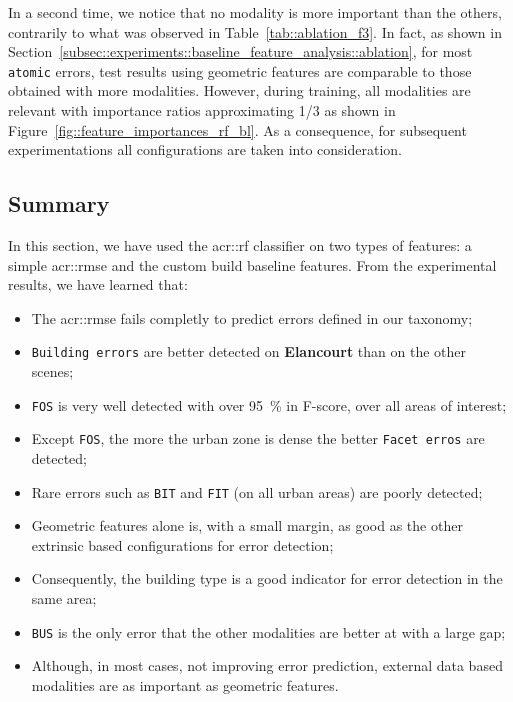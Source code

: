         In a second time, we notice that no modality is more important than the others, contrarily to what was observed in Table~\ref{tab::ablation_f3}.
        In fact, as shown in Section~\ref{subsec::experiments::baseline_feature_analysis::ablation}, for most \texttt{atomic} errors, test results using geometric features are comparable to those obtained with more modalities.
        However, during training, all modalities are relevant with importance ratios approximating \num[fraction-function = \sfrac]{1/3} as shown in Figure~\ref{fig::feature_importances_rf_bl}.
        As a consequence, for subsequent experimentations all configurations are taken into consideration.

    \subsection{Summary}
        \label{subsec::experiments::baseline_feature_analysis::summary}
        In this section, we have used the \gls{acr::rf} classifier on two types of features: a simple \gls{acr::rmse} and the custom build baseline features.
        From the experimental results, we have learned that:
        \begin{itemize}[label=\(\blacktriangleright\)]
            \item The \gls{acr::rmse} fails completly to predict errors defined in our taxonomy;
            \item \texttt{Building errors} are better detected on \textbf{Elancourt} than on the other scenes;
            \item \texttt{FOS} is very well detected with over \SI{95}{\percent} in F-score, over all areas of interest;
            \item Except \texttt{FOS}, the more the urban zone is dense the better \texttt{Facet erros} are detected;
            \item Rare errors such as \texttt{BIT} and \texttt{FIT} (on all urban areas) are poorly detected;
            \item Geometric features alone is, with a small margin, as good as the other extrinsic based configurations for error detection;
            \item Consequently, the building type is a good indicator for error detection in the same area;
            \item \texttt{BUS} is the only error that the other modalities are better at with a large gap;
            \item Although, in most cases, not improving error prediction, external data based modalities are as important as geometric features.
        \end{itemize}
